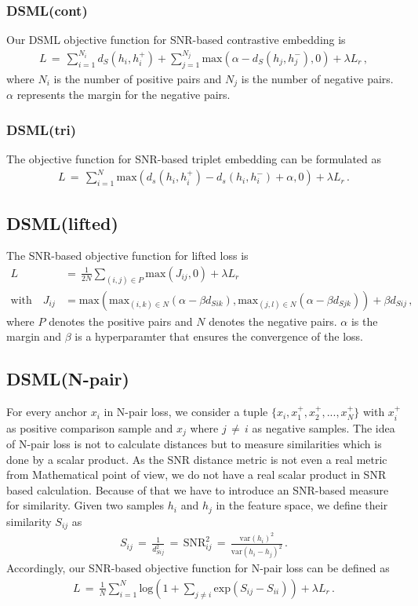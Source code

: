 \documentclass[12pt,paper=a4]{scrartcl}
\theoremstyle{break}
\begin{document}
\subsubsection{DSML(cont)}
Our DSML objective function for SNR-based contrastive embedding is
\begin{align}
L\,=\,\sum_{i=1}^{N_i}d_S\left( h_i,h_i^+\right) +\sum_{j=1}^{N_j}\mathrm{max}\left( \alpha -d_S\left( h_j,h_j^-\right),0\right) + \lambda L_r\, ,
\end{align}
where $N_i$ is the number of positive pairs and $N_j$ is the number of negative pairs. $\alpha$ represents the margin for the negative pairs.
\subsubsection{DSML(tri)}
The objective function for SNR-based triplet embedding can be formulated as
\begin{align}
L\,=\,\sum_{i=1}^N\mathrm{max}\left(d_s\left(h_i,h_i^+\right) - d_s\left( h_i,h_i^-\right)+\alpha,0\right)+\lambda L_r\, .
\end{align}
\subsection{DSML(lifted)}
The SNR-based objective function for lifted loss is
\begin{align}
L\,&=\,\frac{1}{2N}\sum_{(i,j)\in P}\mathrm{max}(J_{ij},0)+\lambda L_r \\
\text{with}\quad J_{ij}&=\mathrm{max}\left(\mathrm{max}_{(i,k)\in N}\left(\alpha - \beta d_{Sik}\right), \mathrm{max}_{(j,l)\in N}\left(\alpha - \beta d_{Sjk}\right)\right)+\beta d_{Sij}\, ,
\end{align}
where $P$ denotes the positive pairs and $N$ denotes the negative pairs. $\alpha$ is the margin and $\beta$ is a hyperparamter that ensures the convergence of the loss.
\subsection{DSML(N-pair)}
For every anchor $x_i$ in N-pair loss, we consider a tuple $\{ x_i, x_1^+, x_2^+, ..., x_N^+\} $ with $x_i^+$ as positive comparison sample and $x_j$ where $j\,\neq\, i$ as negative samples. The idea of N-pair loss is not to calculate distances but to measure similarities which is done by a scalar product. As the SNR distance metric is not even a real metric from Mathematical point of view, we do not have a real scalar product in SNR based calculation. Because of that we have to introduce an SNR-based measure for similarity. Given two samples $h_i$ and $h_j$ in the feature space, we define their similarity $S_{ij}$ as
\begin{align}
S_{ij}\,=\,\frac{1}{d_{Sij}^2}\, = \, \mathrm{SNR}_{ij}^2 \, =\, \frac{\mathrm{var}(h_i)^2}{\mathrm{var}(h_i-h_j)^2}\, .
\end{align}
Accordingly, our SNR-based objective function for N-pair loss can be defined as
\begin{align}
L\,=\,\frac{1}{N}\sum_{i=1}^N\mathrm{log}\left( 1+\sum_{j\neq i}\mathrm{exp}\left( S_{ij}-S_{ii}\right)\right)+\lambda L_r\, .
\end{align}
\end{document}
